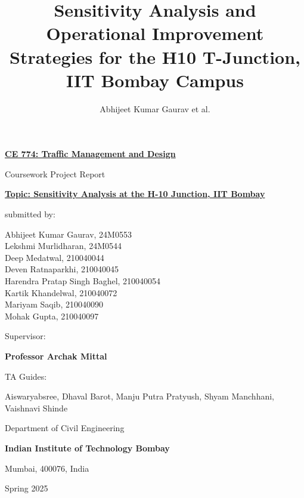\documentclass[11pt]{article}
\title{Sensitivity Analysis and Operational Improvement Strategies for the H10 T-Junction, IIT Bombay Campus}
\author{Abhijeet Kumar Gaurav et al.}
\date{}
\begin{document}
\begin{titlepage}
\centering
\vspace*{0.2cm}
{\Large\bfseries\underline{CE 774: Traffic Management and Design}}\par
\vspace{0.3cm}
{\large Coursework Project Report}\par
\vspace{0.15cm}
{\large\bfseries\underline{Topic: Sensitivity Analysis at the H-10 Junction, IIT Bombay}}\par
\vspace{0.8cm}
submitted by:\par
\vspace{0.15cm}
{\small
Abhijeet Kumar Gaurav, 24M0553\\
Lekshmi Murlidharan, 24M0544\\
Deep Medatwal, 210040044\\
Deven Ratnaparkhi, 210040045\\
Harendra Pratap Singh Baghel, 210040054\\
Kartik Khandelwal, 210040072\\
Mariyam Saqib, 210040090\\
Mohak Gupta, 210040097\par
}
\vspace{0.6cm}
Supervisor:\par
\vspace{0.1cm}
{\bfseries Professor Archak Mittal}\par
\vspace{0.5cm}
TA Guides:\par
\vspace{0.1cm}
{\small Aiswaryabsree, Dhaval Barot, Manju Putra Pratyush, Shyam Manchhani, Vaishnavi Shinde}\par
\vspace{0.7cm}
\par
\vspace{0.5cm}
Department of Civil Engineering\par
\textbf{Indian Institute of Technology Bombay}\par
Mumbai, 400076, India\par
\vspace{0.2cm}
Spring 2025\par
\end{titlepage}

\end{document}
